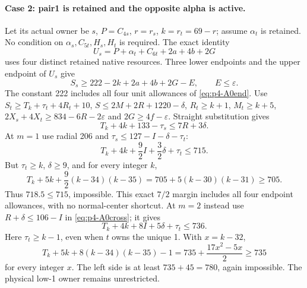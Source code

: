 \documentclass[11pt,letterpaper]{article}
\theoremstyle{definition}\newtheorem{definition}[theorem]{Definition}
\begin{document}
\paragraph{Case 2: pair1 is retained and the opposite alpha is active.}
Let its actual owner be $s$, $P=C_{4s}$, $r=r_s$, $k=r_t=69-r$;
assume $\alpha_t$ is retained. No condition on $\alpha_s,C_{5t},H_s,H_t$
is required. The exact identity
\[
 U_s=P+\alpha_t+C_{6t}+2a+4b+2G
\]
uses four distinct retained native resources. Three lower endpoints and
the upper endpoint of $U_s$ give
\[
 S_s\ge222-2k+2a+4b+2G-E,\qquad E\le\varepsilon.
                                                        \tag{A0-cross-end}
\]
The constant 222 includes all four unit allowances of
\eqref{eq:p4-A0end}. Use
$S_t\ge T_k+\tau_t+4R_t+10$, $S\le2M+2R+1220-\delta$,
$R_t\ge k+1$, $M_t\ge k+5$,
$2X_s+4X_t\ge834-6R-2\varepsilon$ and
$2G\ge4f-\varepsilon$. Straight substitution gives
\begin{equation}
 T_k+4k+133-\tau_s\le7R+3\delta.                 \label{eq:p4-A0cross}
\end{equation}
At $m=1$ use radial 206 and $\tau_s\le127-I-\delta-\tau_t$:
\[
 T_k+4k+\frac92I+\frac32\delta+\tau_t\le715.
\]
But $\tau_t\ge k$, $\delta\ge9$, and for every integer $k$,
\[
 T_k+5k+\frac92(k-34)(k-35)
 =705+5(k-30)(k-31)\ge705.
\]
Thus $718.5\le715$, impossible. This exact $7/2$ margin includes all
four endpoint allowances, with no normal-center shortcut.
At $m=2$ instead use $R+\delta\le106-I$ in
\eqref{eq:p4-A0cross}; it gives
\[
 T_k+4k+8I+5\delta+\tau_t\le736.
\]
Here $\tau_t\ge k-1$, even when $t$ owns the unique 1. With $x=k-32$,
\[
 T_k+5k+8(k-34)(k-35)-1
 =735+\frac{17x^2-5x}{2}\ge735
\]
for every integer $x$. The left side is at least $735+45=780$, again
impossible. The physical low-1 owner remains unrestricted.
\end{document}
